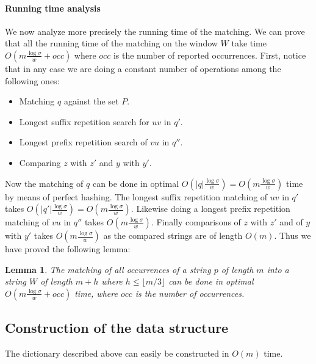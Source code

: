 \documentclass{article}
\newcommand{\?}{\mskip1.5mu}
\newtheorem{lemma}{Lemma}
\begin{document}
\paragraph{Running time analysis}
We now analyze more precisely the running time of the matching. We can prove that all the running time of the matching on the window $W$ take time $O(m\frac{\log\sigma}{w}+occ)$ where $occ$ is the number of reported occurrences. First, notice that in any case we are doing a constant number of operations among the following ones:
\begin{itemize}
\item Matching $q$ against the set $P$. 
\item Longest suffix repetition search for $uv$ in $q'$.
\item Longest prefix repetition search of $vu$ in $q''$. 
\item Comparing $z$ with $z'$ and $y$ with $y'$. 
\end{itemize}
Now the matching of $q$ can be done in optimal $O(|q|\frac{\log\sigma}{w})=O(m\frac{\log\sigma}{w})$ time by means of perfect hashing. The longest suffix repetition matching of $uv$ in $q'$ takes $O(|q'|\frac{\log\sigma}{w})=O(m\frac{\log\sigma}{w})$. Likewise doing a longest prefix repetition matching of $vu$ in $q''$ takes $O(m\frac{\log\sigma}{w})$. Finally comparisons of $z$ with $z'$ and of $y$ with $y'$ takes $O(m\frac{\log\sigma}{w})$ as the compared strings are of length $O(m)$. Thus we have proved the following lemma:
\begin{lemma}
The matching of all occurrences of a string $p$ of length $m$ into a string $W$ of length $m+h$ where $h\leq \lfloor m/3\rfloor$ can be done in optimal $O(m\frac{\log\sigma}{w}+occ)$ time, where $occ$ is the number of occurrences.
\end{lemma}

\subsection{Construction of the data structure}
The dictionary described above can easily be constructed in $O(m)$ time. 
\end{document}

